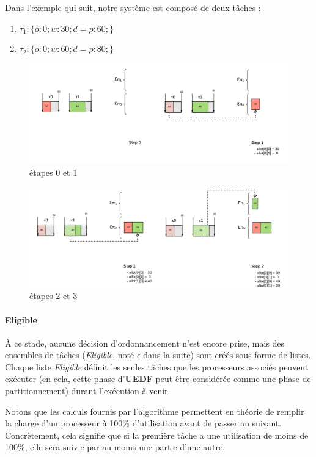 	Dans l'exemple qui suit, notre système est composé de deux tâches :
	\begin{enumerate}
		\setlength\itemsep{0.1em}
		\item $\tau_1 : \{o:0; w:30; d=p:60;\}$
		\item $\tau_2 : \{o:0; w:60; d=p:80;\}$
	\end{enumerate}
	\begin{figure}[H]
		\includegraphics[scale=1]{img/uedf/uedf12}
		\caption{étapes 0 et 1}
	\end{figure}
	\begin{figure}[H]
		\includegraphics[scale=1]{img/uedf/uedf34}
		\caption{étapes 2 et 3}
	\end{figure}
	\paragraph{Eligible}
	À ce stade, aucune décision d'ordonnancement n'est encore prise, mais des ensembles de tâches (\textit{Eligible}, 
	noté $\epsilon$ dans la suite) sont créés sous forme de listes. Chaque liste \textit{Eligible} définit 
	les seules tâches que les processeurs associés peuvent exécuter (en cela, cette phase d'\textbf{UEDF} peut 
	être considérée comme une phase de partitionnement) durant l'exécution à venir.\newline
	
	Notons que les calculs fournis par l'algorithme permettent en théorie de \og{}remplir\fg{} 
	la charge d'un processeur à 100\% d'utilisation avant de passer au suivant. Concrètement, 
	cela signifie que si la première tâche a une utilisation de moins de 100\%, elle sera suivie par 
	au moins une partie d'une autre.\newline
	
